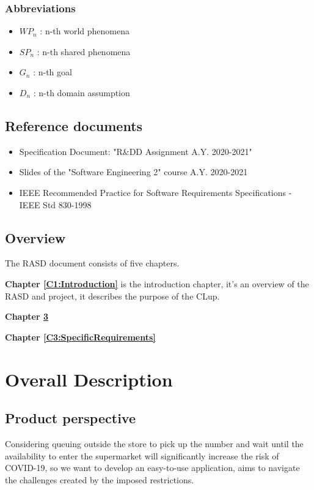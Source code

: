 \documentclass[a4paper,12pt]{book}
\begin{document}
\subsection{Abbreviations}
\begin{itemize}
	\item  $WP_n$ : n-th world phenomena
	\item  $SP_n$ : n-th shared phenomena
	\item  $G_n$ : n-th goal
	\item  $D_n$ : n-th domain assumption
\end{itemize}

\section{Reference documents}

\begin{itemize}
	\item Specification Document: "R\&DD Assignment A.Y. 2020-2021"
	\item Slides of the "Software Engineering 2" course A.Y. 2020-2021
	\item IEEE Recommended Practice for Software Requirements Specifications - IEEE Std 830-1998
\end{itemize}
	
\section{Overview}
The RASD document consists of five chapters.

\textbf{Chapter \ref{C1:Introduction}} is the introduction chapter, it's an overview of the RASD and project, 
it describes the purpose of the CLup.

\textbf{Chapter \ref{C2:OverallDescription}} 

\textbf{Chapter \ref{C3:SpecificRequirements}} 








\chapter{Overall Description} \label{C2:OverallDescription}


\section{Product perspective}
Considering queuing outside the store to pick up the number and wait until the availability to enter the supermarket will significantly increase the risk of COVID-19, so we want to develop an easy-to-use application, aims to navigate the challenges created by the imposed restrictions.
\end{document}
